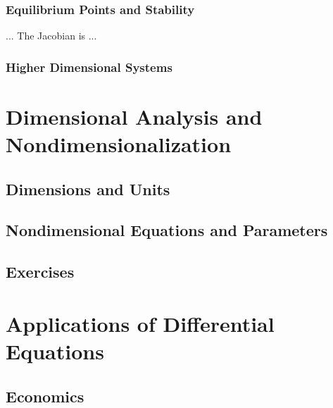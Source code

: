 \documentclass{book}
\begin{document}
\subsection{Equilibrium Points and Stability}
... The Jacobian is ...
\subsection{Higher Dimensional Systems}
%
\chapter[Dimensional Analysis]{Dimensional Analysis and Nondimensionalization}
\section{Dimensions and Units}
\section{Nondimensional Equations and Parameters}
\section{Exercises}
%
\chapter{Applications of Differential Equations}
\section{Economics}
\end{document}
